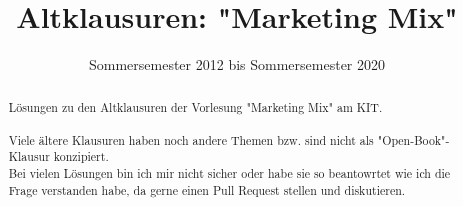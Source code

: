\documentclass[]{article}
\title{Altklausuren: "Marketing Mix"}
\date{Sommersemester 2012 bis Sommersemester 2020}
\begin{document}
\maketitle

\begin{abstract}
Lösungen zu den Altklausuren der Vorlesung "Marketing Mix" am KIT. \\
\ \\
Viele ältere Klausuren haben noch andere Themen bzw. sind nicht als "Open-Book"-Klausur konzipiert. \\
Bei vielen Lösungen bin ich mir nicht sicher oder habe sie so beantowrtet wie ich die Frage verstanden habe, da gerne einen Pull Request stellen und diskutieren. \\
\end{abstract}
\end{document}
